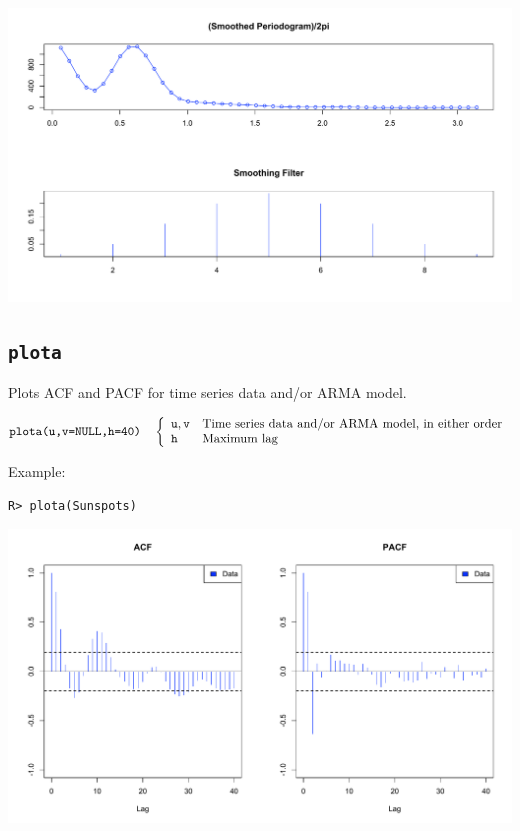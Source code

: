 \documentclass[11pt]{article}
\begin{document}
\begin{center}
\includegraphics[scale=0.3]{Rplot-52.pdf}
\end{center}

\newpage

\subsection{\tt plota}
Plots ACF and PACF for time series data and/or ARMA model.

\bigskip
$
\hbox{\tt plota(u,v=NULL,h=40)}\quad\left\{\begin{array}{ll}
{\tt u, v} & \hbox{Time series data and/or ARMA model, in either order}\\
{\tt h} & \hbox{Maximum lag}
\end{array}\right.
$

\bigskip
\noindent
Example:

\begin{verbatim}
R> plota(Sunspots)
\end{verbatim}

\begin{center}
\includegraphics[scale=0.3]{Rplot-21.pdf}
\end{center}
\end{document}
